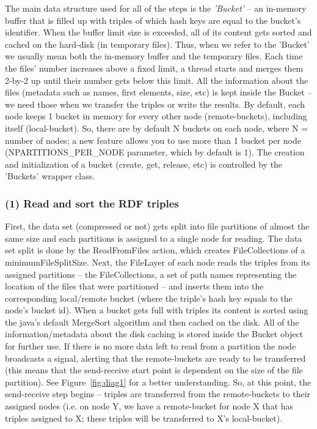 The main data structure used for all of the steps is the \textit{'Bucket'} -- an in-memory buffer that is filled up with triples of which hash keys are equal to the bucket's identifier. When the buffer limit size is exceeded, all of its content gets sorted and cached on the hard-disk (in temporary files). Thus, when we refer to the 'Bucket' we usually mean both the in-memory buffer and the temporary files. Each time the files' number increases above a fixed limit, a thread starts and merges them 2-by-2 up until their number gets below this limit. All the information about the files (metadata such as names, first elements, size, etc) is kept inside the Bucket -- we need those when we transfer the triples or write the results. By default, each node keeps 1 bucket in memory for every other node (remote-buckets), including itself (local-bucket). So, there are by default N buckets on each node, where N = number of nodes; a new feature allows you to use more than 1 bucket per node (NPARTITIONS\_PER\_NODE parameter, which by default is 1). The creation and initialization of a bucket (create, get, release, etc) is controlled by the 'Buckets' wrapper class.

% 
\subsubsection*{(1) Read and sort the RDF triples}

First, the data set (compressed or not) gets split into file partitions of almost the same size and each partitions is assigned to a single node for reading. The data set split is done by the ReadFromFiles action, which creates FileCollections of a minimumFileSplitSize. Next, the FileLayer of each node reads the triples from its assigned partitions -- the FileCollections, a set of path names representing the location of the files that were partitioned -- and inserts them into the corresponding local/remote bucket (where the triple's hash key equals to the node's bucket id). When a bucket gets full with triples its content is sorted using the java's default MergeSort algorithm and then cached on the disk. All of the information/metadata about the disk caching is stored inside the Bucket object for further use. If there is no more data left to read from a partition the node broadcasts a signal, alerting that the remote-buckets are ready to be transferred (this means that the send-receive start point is dependent on the size of the file partition). See Figure~\ref{fig:diag1} for a better understanding. So, at this point, the send-receive step begins -- triples are transferred from the remote-buckets to their assigned nodes (i.e. on node Y, we have a remote-bucket for node X that has triples assigned to X; these triples will be transferred to X's local-bucket).

